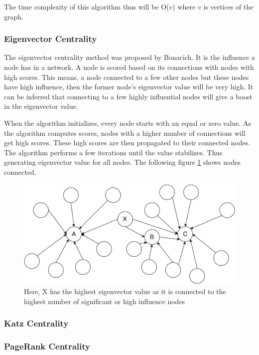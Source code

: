 \documentclass[journal,twoside,web]{ieeecolor}
\begin{document}
The time complexity of this algorithm thus will be O($v$) where $v$ is vertices of the graph.

\subsubsection{Eigenvector Centrality}
The eigenvector centrality method was proposed by Bonacich\cite{26}. It is the influence a node has in a network. A node is scored based on its connections with nodes with high scores. This means, a node connected to a few other nodes but these nodes have high influence, then the former node's eigenvector value will be very high. It can be inferred that connecting to a few highly influential nodes will give a boost in the eigenvector value.

When the algorithm initializes, every node starts with an equal or zero value. As the algorithm computes scores, nodes with a higher number of connections will get high scores. These high scores are then propagated to their connected nodes. The algorithm performs a few iterations until the value stabilizes. Thus generating eigenvector value for all nodes. The following figure \ref{fig9} shows nodes connected.

\begin{figure}[!h]
    \centerline{\includegraphics[scale=0.45]{figures/eigenvector_centrality.pdf}}
    \caption{Here, X has the highest eigenvector value as it is connected to the highest number of significant or high influence nodes}
    \label{fig9}
\end{figure}

\subsubsection{Katz Centrality}
\subsubsection{PageRank Centrality}
\end{document}
